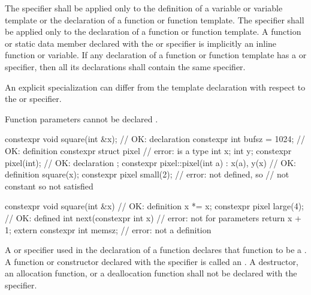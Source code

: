 \pnum
The  specifier shall be applied only to
the definition of a variable or variable template or
the declaration of a function or function template.
The  specifier shall be applied only to
the declaration of a function or function template.
A function or static data member
declared with the  or  specifier
is implicitly an inline function or variable.
If any declaration of a function or function template has
a  or  specifier,
then all its declarations shall contain the same specifier.
\begin{note}
An explicit specialization can differ from the template declaration
with respect to the  or  specifier.
\end{note}
\begin{note}
Function parameters cannot be declared .
\end{note}
\begin{example}
\begin{codeblock}
constexpr void square(int &x);  // OK: declaration
constexpr int bufsz = 1024;     // OK: definition
constexpr struct pixel {        // error:  is a type
  int x;
  int y;
  constexpr pixel(int);         // OK: declaration
};
constexpr pixel::pixel(int a)
  : x(a), y(x)                  // OK: definition
  { square(x); }
constexpr pixel small(2);       // error:  not defined, so 
                                // not constant so  not satisfied

constexpr void square(int &x) { // OK: definition
  x *= x;
}
constexpr pixel large(4);       // OK:  defined
int next(constexpr int x) {     // error: not for parameters
     return x + 1;
}
extern constexpr int memsz;     // error: not a definition
\end{codeblock}
\end{example}

\pnum
A  or  specifier
used in the declaration of a function
declares that function to be
a .
A function or constructor declared with the  specifier
is called an .
A destructor, an allocation function, or a deallocation function
shall not be declared with the  specifier.

